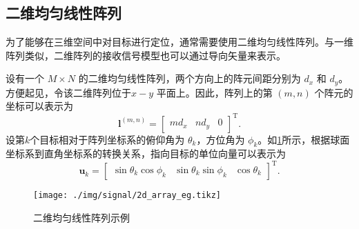 \subsection{二维均匀线性阵列}
为了能够在三维空间中对目标进行定位，通常需要使用二维均匀线性阵列。与一维阵列类似，二维阵列的接收信号模型也可以通过导向矢量来表示。

设有一个 \(M \times N\) 的二维均匀线性阵列，两个方向上的阵元间距分别为 \(d_x\) 和 \(d_y\)。方便起见，令该二维阵列位于\( x-y \) 平面上。因此，阵列上的第 \( (m,n) \) 个阵元的坐标可以表示为
\[
    \bm{l}^{(m, n)} = \begin{bmatrix}
        m d_x & n d_y & 0
    \end{bmatrix}^{\mathrm{T}}.
\]
设第\( k \)个目标相对于阵列坐标系的俯仰角为 \(\theta_k\)，方位角为 \(\phi_k\)。如\cref{fig_2d_array_eg}所示，根据球面坐标系到直角坐标系的转换关系，指向目标的单位向量可以表示为
\[
    \bm{u}_k = \begin{bmatrix}
        \sin\theta_k \cos\phi_k & \sin\theta_k \sin\phi_k & \cos\theta_k
    \end{bmatrix}^{\mathrm{T}}.
\]

\begin{figure}[htb!]
    \centering
    \texttt{[image: ./img/signal/2d\_array\_eg.tikz]}
    \caption{二维均匀线性阵列示例}
    \label{fig_2d_array_eg}
\end{figure}

